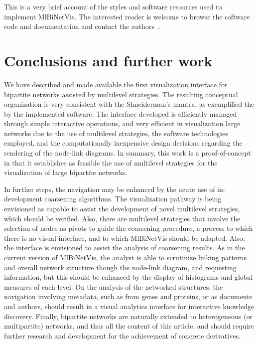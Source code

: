 \documentclass[runningheads]{llncs}
\begin{document}
This is a very brief account of the styles and software resources used to implement
MlBiNetVis. The interested reader is welcome to browse the software code and documentation
and contact the authors~\cite{mbnvcode}.



\section{Conclusions and further work}\label{con}
We have described and made available the first visualization interface for bipartite networks
assisted by multilevel strategies.
The resulting conceptual organization is very consistent with the Shneiderman's mantra,
as exemplified the by the implemented software.
The interface developed is efficiently managed through simple interactive operations,
and very efficient in visualization large networks due to the use of multilevel strategies,
the software technologies employed, and the computationally inexpensive design decisions regarding
the rendering of the node-link diagrams.
In summary, this work is a proof-of-concept in that it establishes as feasible the use
of multilevel strategies for the visualization of large bipartite networks.

In further steps, the navigation may be enhanced by the acute use of in-development coarsening algorithms.
The visualization pathway is being envisioned as capable to assist the development of novel
multilevel strategies, which should be verified.
Also, there are multilevel strategies that involve the selection of nodes as pivots
to guide the coarsening procedure, a process to which there is no visual interface,
and to which MlBiNetVis should be adapted.
Also, the interface is envisioned to assist the analysis of coarsening results. As in the current version of MlBiNetVis,
the analyst is able to scrutinize linking patterns and overall network structure though the node-link diagram,
and requesting information, but this should be enhanced by the display of histograms and global measures of each level.
On the analysis of the networked structures, the navigation involving metadata, such as from genes and proteins, or as
documents and authors, should result in a visual analytics interface for interactive knowledge discovery.
Finally, bipartite networks are naturally extended to heterogeneous (or multipartite) networks,
and thus all the content of this article, and should require further research and development for the achievement
of concrete derivatives.
\end{document}
